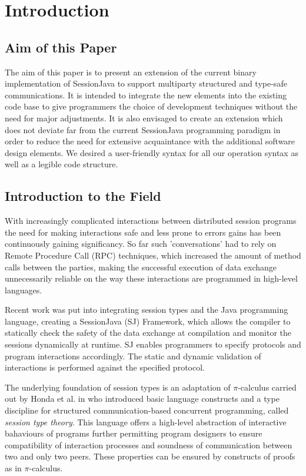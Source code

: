 \chapter{Introduction}
\label{sec:intro}

\section{Aim of this Paper}

The aim of this paper is to present an extension of the current binary implementation of SessionJava to support multiparty structured and type-safe communications. It is intended to integrate the new elements into the existing code base to give programmers the choice of development techniques without the need for major adjustments. It is also envisaged to create an extension which does not deviate far from the current SessionJava programming paradigm in order to reduce the need for extensive acquaintance with the additional software design elements. We desired a user-friendly syntax for all our operation syntax as well as a legible code structure.

\section{Introduction to the Field}

With increasingly complicated interactions between distributed session programs the need for making interactions safe and less prone to errors gains has been continuously gaining significancy. So far such 'conversations' had to rely on Remote Procedure Call (RPC) techniques, which increased the amount of method calls between the parties, making the successful execution of data exchange unnecessarily reliable on the way these interactions are programmed in high-level languages.

Recent work was put into integrating session types and the Java programming language, creating a SessionJava (SJ) Framework, which allows the compiler to statically check the safety of the data exchange at compilation and monitor the sessions dynamically at runtime\cite{sessionbased_programming}. SJ enables programmers to specify protocols and program interactions accordingly. The static and dynamic validation of interactions is performed against the specified protocol.

The underlying foundation of session types is an adaptation of $\pi$-calculus carried out by Honda et al. in \cite{language_primitives} who introduced basic language constructs and a type discipline for structured communication-based concurrent programming, called \textit{session type theory}. This language offers a high-level abstraction of interactive bahaviours of programs further permitting program designers to ensure compatibility of interaction processes and soundness of communication between two and only two peers. These properties can be ensured by constructs of proofs as in $\pi$-calculus.

